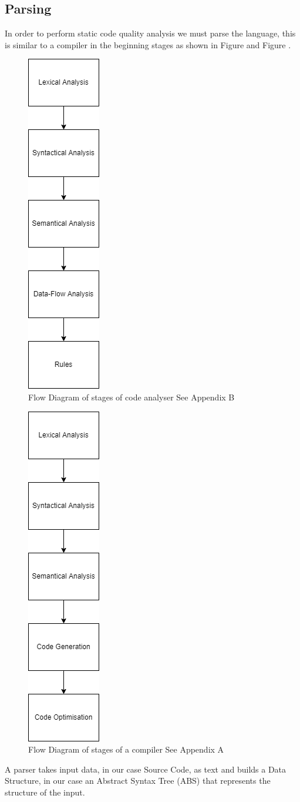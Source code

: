 \subsection{Parsing}
In order to perform static code quality analysis we must parse the language, this is similar to a compiler in the beginning stages 
as shown in Figure  and Figure .
\begin{figure}[h]
    \includegraphics[width=.11\textwidth]{appendix/B/CodeAnalyser.png}
    \caption{Flow Diagram of stages of code analyser See Appendix B}
    \label{fig:codeanalyser}
\end{figure}
\begin{figure}[h]
    \includegraphics[width=.11\textwidth]{appendix/C/compiler.png}
    \caption{Flow Diagram of stages of a compiler See Appendix A}
    \label{fig:compiler}
\end{figure}
A parser takes input data, in our case Source Code, as text and builds a Data Structure, in our case an Abstract Syntax Tree (ABS) that represents 
the structure of the input. 
